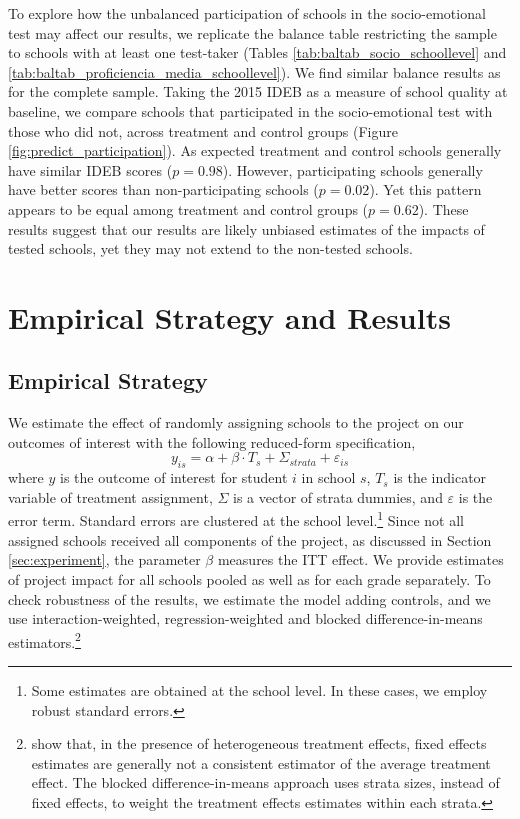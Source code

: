 \documentclass[11pt,a4paper]{article}
\begin{document}
	To explore how the unbalanced participation of schools in the socio-emotional test may affect our results, we replicate the balance table restricting the sample to schools with at least one test-taker (Tables \ref{tab:baltab_socio_schoollevel} and \ref{tab:baltab_proficiencia_media_schoollevel}). We find similar balance results as for the complete sample. Taking the 2015 IDEB as a measure of school quality at baseline, we compare schools that participated in the socio-emotional test with those who did not, across treatment and control groups (Figure \ref{fig:predict_participation}). As expected treatment and control schools generally have similar IDEB scores ($p=0.98$). However, participating schools generally have better scores than non-participating schools ($p=0.02$). Yet this pattern appears to be equal among treatment and control groups ($p=0.62$). These results suggest that our results are likely unbiased estimates of the impacts of tested schools, yet they may not extend to the non-tested schools. 
	
	
	
	\section{Empirical Strategy and Results} \label{sec:methodology_results}
	\subsection{Empirical Strategy} \label{sec:methodology}
	
	We estimate the effect of randomly assigning schools to the project on our outcomes of interest with the following reduced-form specification,
	\begin{equation} \label{eq:OLS}
	y_{is} = \alpha + \beta \cdot T_{s} + \Sigma_{strata} + \varepsilon_{is}
	\end{equation}
	where $y$ is the outcome of interest for student $i$ in school $s$, $T_s$ is the indicator variable of treatment assignment, $\Sigma$ is a vector of strata dummies, and $\varepsilon$ is the error term. Standard errors are clustered at the school level.\footnote{Some estimates are obtained at the school level. In these cases, we employ robust standard errors.} Since not all assigned schools received all components of the project, as discussed in Section \ref{sec:experiment}, the parameter $\beta$ measures the ITT effect. We provide estimates of project impact for all schools pooled as well as for each grade separately. To check robustness of the results, we estimate the model adding controls, and we use interaction-weighted, regression-weighted and blocked difference-in-means estimators.\footnote{\cite{gibbons2018broken} show that, in the presence of heterogeneous treatment effects, fixed effects estimates are generally not a consistent estimator of the average treatment effect. The blocked difference-in-means approach uses strata sizes, instead of fixed effects, to weight the treatment effects estimates within each strata.}
	
\end{document}
